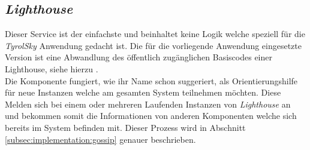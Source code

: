 \subsection{\textit{Lighthouse}}
Dieser Service ist der einfachste und beinhaltet keine Logik welche speziell für die \textit{TyrolSky} Anwendung gedacht ist. Die für die vorliegende Anwendung eingesetzte  Version ist eine Abwandlung des öffentlich zugänglichen Basiscodes einer Lighthouse, siehe hierzu \cite{lighthouse}. \\
Die Komponente fungiert, wie ihr Name schon suggeriert, als Orientierungshilfe für neue Instanzen welche am gesamten System teilnehmen möchten. Diese Melden sich bei einem oder mehreren Laufenden Instanzen von \textit{Lighthouse} an und bekommen somit die Informationen von anderen Komponenten welche sich bereits im System befinden mit. Dieser Prozess wird in Abschnitt \ref{subsec:implementation:gossip} genauer beschrieben.

